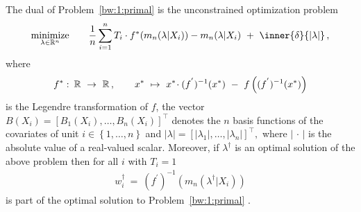 \begin{ftheorem*}
  The dual of 
  Problem~\ref{bw:1:primal}
  is the unconstrained optimization problem 
  \begin{gather*}
    \underset{\lambda \in \R^n}{\mathrm{minimize}}
    \qquad
    \frac{1}{n}
    \sum_{i = 1}^{n} 
    T_i 
    \cdot
    f^*
    (
      m_n(\lambda|X_i)
    )
    -
      m_n(\lambda|X_i)
    \ 
    +
    \ 
    \inner{\delta}{\left| \lambda \right|}
    \,,
  \end{gather*}
  where
  \begin{gather*}
  f^*
  \,
  \colon
  \, 
  \R
  \ 
  \to
  \ 
  \R
  \,
  ,
  \qquad 
  x^*
  \ 
  \mapsto
  \ 
    x^*
    \!
    \cdot
    (f^{'})^{-1}(x^*)
  \ 
    -
  \ 
    f
    \left( 
      (f^{'})^{-1}(x^*)
    \right)
  \end{gather*}
  is the Legendre transformation of $f$,
  the vector
  $
    B(X_i)
    =
    \left[ 
      B_1(X_i)
      ,
      \ldots
      ,
      B_n(X_i)
    \right]
    ^\top
  $
  denotes 
  the $n$ basis functions of the covariates 
  of unit $i\in \left\{ 1, \ldots, n \right\}$
  and
  $
    \left| \lambda \right|
    =
    \left[ 
      \left| \lambda_1 \right|
      ,
      \ldots
      ,
      \left| \lambda_n \right|
    \right]
    ^\top
    ,
  $
  where $\left| \,\cdot\, \right|$
  is the absolute value of a real-valued scalar.
  Moreover,
  if $\lambda^\dagger$
  is an optimal solution of the above problem 
  then
  for all $i$ with $T_i=1$
  \begin{gather*}
    w_i^\dagger
    \ 
    =
    \ 
    (f^{'})^{-1}
    \left( 
      m_n
      (
      \lambda^\dagger
      |
      X_i
      )
    \right)
  \end{gather*}
  is part of the optimal solution to 
  Problem~\ref{bw:1:primal}
  .
\end{ftheorem*}
